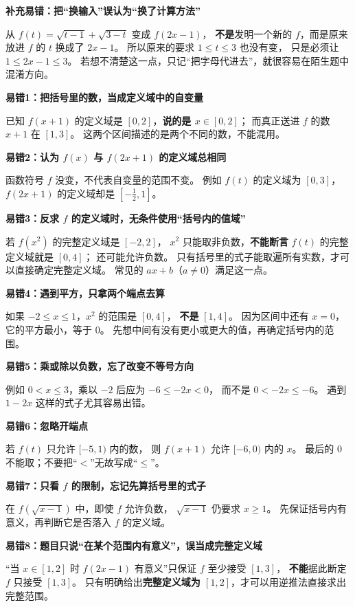 \clearpage
\begin{trapbox}
\textbf{\textcolor{CTrap}{补充易错：把“换输入”误认为“换了计算方法”}}

从 $f(t)=\sqrt{t-1}+\sqrt{3-t}$ 变成 $f(2x-1)$，
\textbf{不是}发明一个新的 $f$，而是原来放进 $f$ 的 $t$ 换成了 $2x-1$。
所以原来的要求 $1\le t\le3$ 也没有变，
只是必须让 $1\le2x-1\le3$。
若想不清楚这一点，只记“把字母代进去”，就很容易在陌生题中混淆方向。

\medskip

\textbf{\textcolor{CTrap}{易错1：把括号里的数，当成定义域中的自变量}}

已知 $f(x+1)$ 的定义域是 $[0,2]$，\textbf{说的是 $x\in[0,2]$}；
而真正送进 $f$ 的数 $x+1$ 在 $[1,3]$。
这两个区间描述的是两个不同的数，不能混用。

\medskip
\textbf{\textcolor{CTrap}{易错2：认为 $f(x)$ 与 $f(2x+1)$ 的定义域总相同}}

函数符号 $f$ 没变，不代表自变量的范围不变。
例如 $f(t)$ 的定义域为 $[0,3]$，$f(2x+1)$ 的定义域却是 $[-\frac12,1]$。

\medskip
\textbf{\textcolor{CTrap}{易错3：反求 $f$ 的定义域时，无条件使用“括号内的值域”}}

若 $f(x^2)$ 的完整定义域是 $[-2,2]$，
$x^2$ 只能取非负数，\textbf{不能断言} $f(t)$ 的完整定义域就是 $[0,4]$；
还可能允许负数。
只有括号里的式子能取遍所有实数，才可以直接确定完整定义域。
常见的 $ax+b$（$a\ne0$）满足这一点。

\medskip
\textbf{\textcolor{CTrap}{易错4：遇到平方，只拿两个端点去算}}

如果 $-2\le x\le1$，$x^2$ 的范围是 $[0,4]$，
\textbf{不是} $[1,4]$。
因为区间中还有 $x=0$，它的平方最小，等于 $0$。
先想中间有没有更小或更大的值，再确定括号内的范围。

\medskip
\textbf{\textcolor{CTrap}{易错5：乘或除以负数，忘了改变不等号方向}}

例如 $0<x\le3$，乘以 $-2$ 后应为 $-6\le-2x<0$，
而不是 $0<-2x\le-6$。
遇到 $1-2x$ 这样的式子尤其容易出错。

\medskip
\textbf{\textcolor{CTrap}{易错6：忽略开端点}}

若 $f(t)$ 只允许 $[-5,1)$ 内的数，
则 $f(x+1)$ 允许 $[-6,0)$ 内的 $x$。
最后的 $0$ 不能取；不要把“$<$”无故写成“$\le$”。

\medskip
\textbf{\textcolor{CTrap}{易错7：只看 $f$ 的限制，忘记先算括号里的式子}}

在 $f(\sqrt{x-1})$ 中，即使 $f$ 允许负数，
$\sqrt{x-1}$ 仍要求 $x\ge1$。
先保证括号内有意义，再判断它是否落入 $f$ 的定义域。

\medskip
\textbf{\textcolor{CTrap}{易错8：题目只说“在某个范围内有意义”，误当成完整定义域}}

“当 $x\in[1,2]$ 时 $f(2x-1)$ 有意义”只保证 $f$ 至少接受 $[1,3]$，
\textbf{不能}据此断定 $f$ 只接受 $[1,3]$。
只有明确给出\textbf{完整定义域为 $[1,2]$}，才可以用逆推法直接求出完整范围。
\end{trapbox}
